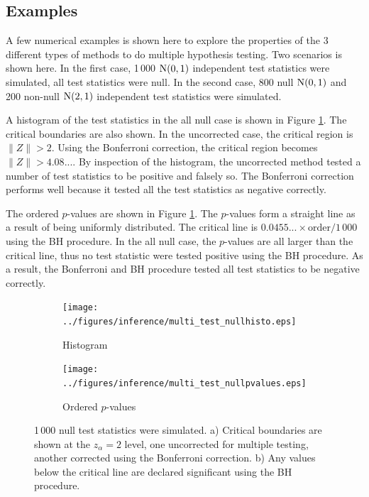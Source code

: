 \subsection{Examples}

A few numerical examples is shown here to explore the properties of the 3 different types of methods to do multiple hypothesis testing. Two scenarios is shown here. In the first case, 1\,000 $\operatorname{N}(0,1)$ independent test statistics were simulated, all test statistics were null. In the second case, 800 null $\operatorname{N}(0,1)$ and 200 non-null $\operatorname{N}(2,1)$ independent test statistics were simulated. 

A histogram of the test statistics in the all null case is shown in Figure \ref{fig:inference_multi_test_nullhisto_pvalues}. The critical boundaries are also shown. In the uncorrected case, the critical region is $\|Z\|>2$. Using the Bonferroni correction, the critical region becomes $\|Z\|>4.08...$. By inspection of the histogram, the uncorrected method tested a number of test statistics to be positive and falsely so. The Bonferroni correction performs well because it tested all the test statistics as negative correctly.

The ordered $p$-values are shown in Figure \ref{fig:inference_multi_test_nullhisto_pvalues}. The $p$-values form a straight line as a result of being uniformly distributed. The critical line is $0.0455...\times\text{order}/1\,000$ using the BH procedure. In the all null case, the $p$-values are all larger than the critical line, thus no test statistic were tested positive using the BH procedure. As a result, the Bonferroni and BH procedure tested all test statistics to be negative correctly.

\begin{figure}
    \centering
    \begin{subfigure}[b]{0.8\textwidth}
    	\texttt{[image: ../figures/inference/multi\_test\_nullhisto.eps]}
    	\caption{Histogram}
    \end{subfigure}
	\begin{subfigure}[b]{0.8\textwidth}
    	\texttt{[image: ../figures/inference/multi\_test\_nullpvalues.eps]}
    	\caption{Ordered $p$-values}
    \end{subfigure}
    \caption{1\,000 null test statistics were simulated. a) Critical boundaries are shown at the $z_\alpha=2$ level, one uncorrected for multiple testing, another corrected using the Bonferroni correction. b) Any values below the critical line are declared significant using the BH procedure.}
    \label{fig:inference_multi_test_nullhisto_pvalues}
\end{figure}

